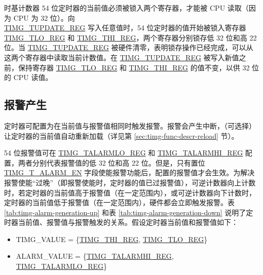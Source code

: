 \documentclass[main\_\_CN.tex]{subfiles}
\begin{document}
时基计数器 54 位定时器的当前值必须被锁入两个寄存器，才能被 CPU 读取（因为 CPU 为 32 位）。向 \\\hyperref[regdesc:TIMGTXUPDATEREG]{TIMG\_TUPDATE\_REG} 写入任意值时，54 位定时器的值开始被锁入寄存器 \hyperref[regdesc:TIMGTXLOREG]{TIMG\_TLO\_REG} 和 \hyperref[regdesc:TIMGTXHIREG]{TIMG\_THI\_REG}，两个寄存器分别锁存低 32 位和高 22 位。当 \hyperref[regdesc:TIMGTXUPDATEREG]{TIMG\_TUPDATE\_REG} 被硬件清零，表明锁存操作已经完成，可以从这两个寄存器中读取当前计数值。在 \hyperref[regdesc:TIMGTXUPDATEREG]{TIMG\_TUPDATE\_REG} 被写入新值之前，保持寄存器 \hyperref[regdesc:TIMGTXLOREG]{TIMG\_TLO\_REG} 和 \hyperref[regdesc:TIMGTXHIREG]{TIMG\_THI\_REG}
的值不变，以供 32 位的 CPU 读值。

\subsection{报警产生}
定时器可配置为在当前值与报警值相同时触发报警。报警会产生中断，（可选择）让定时器的当前值自动重新加载（详见第 \ref{sec:timg-func-descr-reload} 节）。

54 位报警值可在 \hyperref[regdesc:TIMGTXALARMLOREG]{TIMG\_TALARMLO\_REG} 和 \hyperref[regdesc:TIMGTXALARMHIREG]{TIMG\_TALARMHI\_REG} 配置，两者分别代表报警值的低 32 位和高 22 位。但是，只有置位 \hyperref[fielddesc:TIMGTXALARMEN]{TIMG\_T\_ALARM\_EN} 字段使能报警功能后，配置的报警值才会生效。为解决报警使能“过晚”（即报警使能时，定时器的值已过报警值），可逆计数器向上计数时，若定时器的当前值高于报警值（在一定范围内），或可逆计数器向下计数时，定时器的当前值低于报警值（在一定范围内），硬件都会立即触发报警。表 \ref{tab:timg-alarm-generation-up} 和表 \ref{tab:timg-alarm-generation-down} 说明了定时器当前值、报警值与报警触发的关系。假设定时器当前值和报警值如下：

\begin{itemize}
    \item TIMG\_VALUE = \{\hyperref[regdesc:TIMGTXHIREG]{TIMG\_THI\_REG}, \hyperref[regdesc:TIMGTXLOREG]{TIMG\_TLO\_REG}\}
    \item ALARM\_VALUE = \{\hyperref[regdesc:TIMGTXALARMHIREG]{TIMG\_TALARMHI\_REG}, \hyperref[regdesc:TIMGTXALARMLOREG]{TIMG\_TALARMLO\_REG}\}
\end{itemize}
\end{document}
